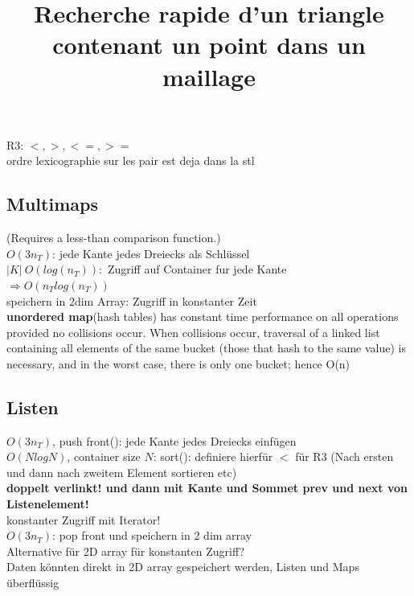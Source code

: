 \documentclass[10pt]{article}
\begin{document}
	
\title{Recherche rapide d’un triangle contenant un point dans un maillage}

\section{}

R3: $<,>,<=,>=$\\
ordre lexicographie sur les pair est deja dans la stl

\subsection{Multimaps}
(Requires a less-than comparison function.)\\

$ O(3 n_T)$: jede Kante jedes Dreiecks als Schlüssel\\
$|K| \ O(log(n_T)):$ Zugriff auf Container fur jede Kante\\
$\Rightarrow O(n_T log(n_T))$\\
speichern in 2dim Array: Zugriff in konstanter Zeit\\

\textbf{unordered map}(hash tables) has constant time performance on all operations provided no collisions occur. When collisions occur, traversal of a linked list containing all elements of the same bucket (those that hash to the same value) is necessary, and in the worst case, there is only one bucket; hence O(n)\\

\subsection{Listen}

$ O(3 n_T)$, push front(): jede Kante jedes Dreiecks einfügen\\
$ O(N logN)$, container size $N$: sort(): definiere hierfür $<$ für R3 (Nach ersten und dann nach zweitem Element sortieren etc)\\

\textbf{doppelt verlinkt! und dann mit Kante und Sommet prev und next von Listenelement!}\\
konstanter Zugriff mit Iterator!\\

$ O(3 n_T)$: pop front und speichern in 2 dim array\\

Alternative für 2D array für konstanten Zugriff?\\
Daten könnten direkt in 2D array gespeichert werden, Listen und Maps überflüssig\\
\end{document}
